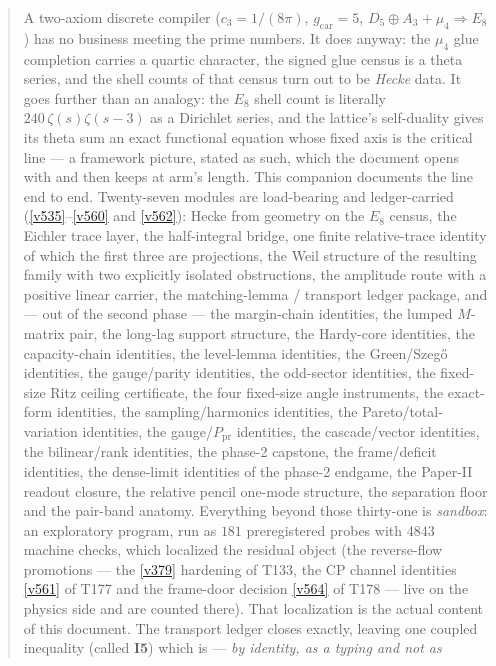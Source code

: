 \documentclass[11pt,a4paper]{article}
\newcommand{\cthree}{c_3}
\newcommand{\gcar}{g_{\mathrm{car}}}
\begin{document}
\begin{abstract}
\noindent A two-axiom discrete compiler ($\cthree=1/(8\pi)$, $\gcar=5$, $D_5\oplus A_3+\mu_4\Rightarrow
E_8$) has no business meeting the prime numbers. It does anyway: the $\mu_4$ glue completion carries a
quartic character, the signed glue census is a theta series, and the shell counts of that census turn
out to be \emph{Hecke} data. It goes further than an analogy: the $E_8$ shell count is literally
$240\,\zeta(s)\zeta(s-3)$ as a Dirichlet series, and the lattice's self-duality gives its theta sum an
exact functional equation whose fixed axis is the critical line --- a framework picture, stated as such,
which the document opens with and then keeps at arm's length. This companion documents the line end to
end. Twenty-seven modules are
load-bearing and ledger-carried (\vref{v535}--\vref{v560} and \vref{v562}): Hecke from geometry on the $E_8$ census,
the Eichler trace layer, the half-integral bridge, one finite relative-trace identity of which the
first three are projections, the Weil structure of the resulting family with two explicitly isolated
obstructions, the amplitude route with a positive linear carrier, the matching-lemma / transport
ledger package, and --- out of the second phase --- the margin-chain identities, the lumped
$M$-matrix pair, the long-lag support structure, the Hardy-core identities, the capacity-chain
identities, the level-lemma identities, the Green/Szeg\H{o} identities, the gauge/parity
identities, the odd-sector identities, the fixed-size Ritz ceiling certificate, the four
fixed-size angle instruments, the exact-form identities, the sampling/harmonics
identities, the Pareto/total-variation identities, the gauge/$P_{\mathrm{pr}}$
identities, the cascade/vector identities, the bilinear/rank identities, the phase-2
capstone, the frame/deficit identities, the dense-limit identities of the phase-2
endgame, the Paper-II readout closure, the relative pencil one-mode structure, the separation
floor and the pair-band anatomy. Everything beyond
those thirty-one is \emph{sandbox}: an exploratory program, run as
$181$ preregistered probes with $4843$ machine checks, which localized the residual object
(the reverse-flow promotions --- the \vref{v379} hardening of T133, the CP channel
identities \vref{v561} of T177 and the frame-door decision \vref{v564} of T178 --- live on
the physics side and are counted there). That
localization is the actual content of this document. The transport ledger closes exactly, leaving one
coupled inequality (called \textbf{I5}) which is --- \emph{by identity, as a typing and not as
}
\end{abstract}
\end{document}

